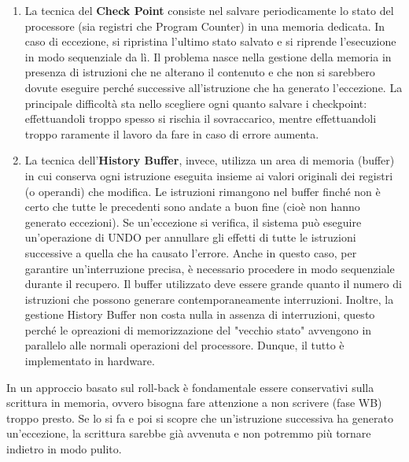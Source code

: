 \begin{enumerate}
    \item La tecnica del \textbf{Check Point} consiste nel salvare periodicamente lo stato del processore (sia registri che Program Counter) in una memoria dedicata. In caso di eccezione, si ripristina l’ultimo stato salvato e si riprende l'esecuzione in modo sequenziale da lì. Il problema nasce nella gestione della memoria in presenza di istruzioni che ne alterano il contenuto e che non si sarebbero dovute eseguire perché successive all'istruzione che ha generato l'eccezione.
    La principale difficoltà sta nello scegliere ogni quanto salvare i checkpoint: effettuandoli troppo spesso si rischia il sovraccarico, mentre effettuandoli troppo raramente il lavoro da fare in caso di errore aumenta.
    \item La tecnica dell'\textbf{History Buffer}, invece, utilizza un area di memoria (buffer) in cui conserva ogni istruzione eseguita insieme ai valori originali dei registri (o operandi) che modifica. Le istruzioni rimangono nel buffer finché non è certo che tutte le precedenti sono andate a buon fine (cioè non hanno generato eccezioni). Se un’eccezione si verifica, il sistema può eseguire un'operazione di UNDO per annullare gli effetti di tutte le istruzioni successive a quella che ha causato l'errore. Anche in questo caso, per garantire un’interruzione precisa, è necessario procedere in modo sequenziale durante il recupero. Il buffer utilizzato deve essere grande quanto il numero di istruzioni che possono generare contemporaneamente interruzioni. Inoltre, la gestione History Buffer non costa nulla in assenza di interruzioni, questo perché le opreazioni di memorizzazione del "vecchio stato" avvengono in parallelo alle normali operazioni del processore. Dunque, il tutto è implementato in hardware.
\end{enumerate}

In un approccio basato sul roll-back è fondamentale essere conservativi sulla scrittura in memoria, ovvero bisogna fare attenzione a non scrivere (fase WB) troppo presto. Se lo si fa e poi si scopre che un'istruzione successiva ha generato un'eccezione, la scrittura sarebbe già avvenuta e non potremmo più tornare indietro in modo pulito.

